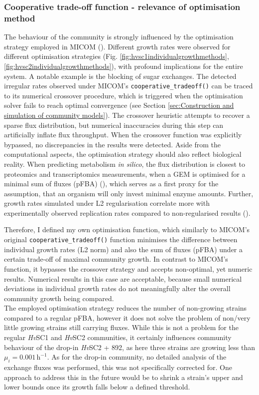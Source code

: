 \subsubsection{Cooperative trade-off function - relevance of optimisation method}
The behaviour of the community is strongly influenced by the optimisation strategy employed in MICOM (\cite{diener_micom_2020}). Different growth rates were observed for different optimisation strategies (Fig. \ref{fig:hvsc1individualgrowthmethods}, \ref{fig:hvsc2individualgrowthmethods}), with profound implications for the entire system. A notable example is the blocking of sugar exchanges. The detected irregular rates observed under MICOM’s \texttt{cooperative\_tradeoff()} can be traced to its numerical crossover procedure, which is triggered when the optimisation solver fails to reach optimal convergence (see Section \ref{sec:Construction and simulation of community models}). The crossover heuristic attempts to recover a sparse flux distribution, but numerical inaccuracies during this step can artificially inflate flux throughput. When the crossover function was explicitly bypassed, no discrepancies in the results were detected. 
Aside from the computational aspects, the optimisation strategy should also reflect biological reality. When predicting metabolism \textit{in silico}, the flux distribution is closest to proteomics and transcriptomics measurements, when a GEM is optimised for a minimal sum of fluxes (pFBA) (\cite{lewis_omic_2010}), which serves as a first proxy for the assumption, that an organism will only invest minimal enzyme amounts. Further, growth rates simulated under L2 regularisation correlate more with experimentally observed replication rates compared to non-regularised results (\cite{diener_micom_2020}). 
\newpage

Therefore, I defined my own optimisation function, which similarly to MICOM’s original \linebreak \texttt{cooperative\_tradeoff()} function minimises the difference between individual growth rates (L2 norm) and also the sum of fluxes (pFBA) under a certain trade-off of maximal community growth. In contrast to MICOM’s function, it bypasses the crossover strategy and accepts non-optimal, yet numeric results. Numerical results in this case are acceptable, because small numerical deviations in individual growth rates do not meaningfully alter the overall community growth being compared. 
\\


The employed optimisation strategy reduces the number of non-growing strains compared to a regular pFBA, however it does not solve the problem of non/very little growing strains still carrying fluxes. While this is not a problem for the regular \textit{Hv}SC1 and \textit{Hv}SC2 communities, it certainly influences community behaviour of the drop-in \textit{Hv}SC2 + 892, as here three strains are growing less than $\mu_i = 0.001 \,\text{h}^{-1}$. As for the drop-in community, no detailed analysis of the exchange fluxes was performed, this was not specifically corrected for. One approach to address this in the future would be to shrink a strain’s upper and lower bounds once its growth falls below a defined threshold.
\\


